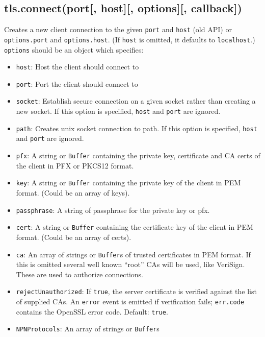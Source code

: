 \subsection{tls.connect(port{[}, host{]}{[}, options{]}{[},
callback{]})}\label{tls.connectport-host-options-callback}

Creates a new client connection to the given \texttt{port} and
\texttt{host} (old API) or \texttt{options.port} and
\texttt{options.host}. (If \texttt{host} is omitted, it defaults to
\texttt{localhost}.) \texttt{options} should be an object which
specifies:

\begin{itemize}
\item
  \texttt{host}: Host the client should connect to
\item
  \texttt{port}: Port the client should connect to
\item
  \texttt{socket}: Establish secure connection on a given socket rather
  than creating a new socket. If this option is specified, \texttt{host}
  and \texttt{port} are ignored.
\item
  \texttt{path}: Creates unix socket connection to path. If this option
  is specified, \texttt{host} and \texttt{port} are ignored.
\item
  \texttt{pfx}: A string or \texttt{Buffer} containing the private key,
  certificate and CA certs of the client in PFX or PKCS12 format.
\item
  \texttt{key}: A string or \texttt{Buffer} containing the private key
  of the client in PEM format. (Could be an array of keys).
\item
  \texttt{passphrase}: A string of passphrase for the private key or
  pfx.
\item
  \texttt{cert}: A string or \texttt{Buffer} containing the certificate
  key of the client in PEM format. (Could be an array of certs).
\item
  \texttt{ca}: An array of strings or \texttt{Buffer}s of trusted
  certificates in PEM format. If this is omitted several well known
  ``root'' CAs will be used, like VeriSign. These are used to authorize
  connections.
\item
  \texttt{rejectUnauthorized}: If \texttt{true}, the server certificate
  is verified against the list of supplied CAs. An
  \texttt{\textquotesingle{}error\textquotesingle{}} event is emitted if
  verification fails; \texttt{err.code} contains the OpenSSL error code.
  Default: \texttt{true}.
\item
  \texttt{NPNProtocols}: An array of strings or \texttt{Buffer}s

\end{itemize}
